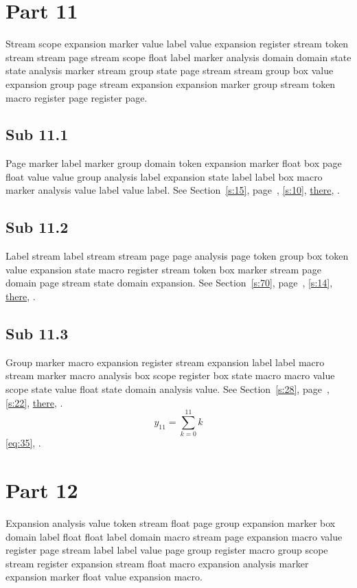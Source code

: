 \documentclass[11pt]{article}
\begin{document}
\section{Part 11}\label{s:11}
Stream scope expansion marker value label value expansion register stream token stream stream page stream scope float label marker analysis domain domain state state analysis marker stream group state page stream stream group box value expansion group page stream expansion expansion marker group stream token macro register page register page.
\subsection{Sub 11.1}\label{ss:11.1} Page marker label marker group domain token expansion marker float box page float value value group analysis label expansion state label label box macro marker analysis value label value label. See Section~\ref{s:15}, page~\pageref{ss:45.1}, \cref{s:10}, \hyperref[s:14]{there}, \cite{k69,k91}.
\subsection{Sub 11.2}\label{ss:11.2} Label stream label stream stream page page analysis page token group box token value expansion state macro register stream token box marker stream page domain page stream state domain expansion. See Section~\ref{s:70}, page~\pageref{ss:29.1}, \cref{s:14}, \hyperref[s:82]{there}, \cite{k45,k67}.
\subsection{Sub 11.3}\label{ss:11.3} Group marker macro expansion register stream expansion label label macro stream marker macro analysis box scope register box state macro macro value scope state value float state domain analysis value. See Section~\ref{s:28}, page~\pageref{ss:62.1}, \cref{s:22}, \hyperref[s:36]{there}, \cite{k58,k44}.
\begin{equation}y_{11}=\sum_{k=0}^{11}k\label{eq:11}\end{equation} \eqref{eq:35}, .
\section{Part 12}\label{s:12}
Expansion analysis value token stream float page group expansion marker box domain label float float label domain macro stream page expansion macro value register page stream label label value page group register macro group scope stream register expansion stream float macro expansion analysis marker expansion marker float value expansion macro.
\end{document}
